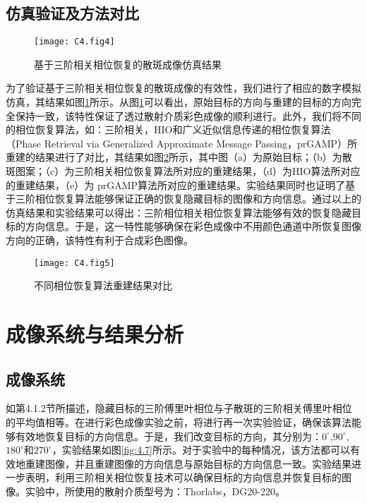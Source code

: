 \subsection{仿真验证及方法对比}

\begin{figure}[htp]
	\centering
	\texttt{[image: C4.fig4]}
	\caption{基于三阶相关相位恢复的散斑成像仿真结果}
	\label{fig:4.4}
\end{figure}

为了验证基于三阶相关相位恢复的散斑成像的有效性，我们进行了相应的数字模拟仿真，其结果如图\ref{fig:4.4}所示。从图\ref{fig:4.4}可以看出，原始目标的方向与重建的目标的方向完全保持一致，该特性保证了透过散射介质彩色成像的顺利进行。此外，我们将不同的相位恢复算法，如：三阶相关，HIO和广义近似信息传递的相位恢复算法（Phase Retrieval via Generalized Approximate Message Passing，prGAMP）所重建的结果进行了对比，其结果如图\ref{fig:4.5}所示，其中图（a）为原始目标；（b）为散斑图案；（c）为三阶相关相位恢复算法所对应的重建结果，（d）为HIO算法所对应的重建结果，（e）为 prGAMP算法所对应的重建结果。实验结果同时也证明了基于三阶相位恢复算法能够保证正确的恢复隐藏目标的图像和方向信息。通过以上的仿真结果和实验结果可以得出：三阶相位相关相位恢复算法能够有效的恢复隐藏目标的方向信息。于是，这一特性能够确保在彩色成像中不用颜色通道中所恢复图像方向的正确，该特性有利于合成彩色图像。

\begin{figure}[htp]
	\centering
	\texttt{[image: C4.fig5]}
	\caption{不同相位恢复算法重建结果对比}
	\label{fig:4.5}
\end{figure}

\section{成像系统与结果分析}
\subsection{成像系统}

如第4.1.2节所描述，隐藏目标的三阶傅里叶相位与子散斑的三阶相关傅里叶相位的平均值相等。在进行彩色成像实验之前，将进行再一次实验验证，确保该算法能够有效地恢复目标的方向信息。于是，我们改变目标的方向，其分别为：$0^{\circ}$,$90^{\circ}$,$180^{\circ}$和$270^{\circ}$，实验结果如图\ref{fig:4.7}所示。对于实验中的每种情况，该方法都可以有效地重建图像，并且重建图像的方向信息与原始目标的方向信息一致。实验结果进一步表明，利用三阶相关相位恢复技术可以确保目标的方向信息并恢复目标的图像。实验中，所使用的散射介质型号为：Thorlabs，DG20-220。

